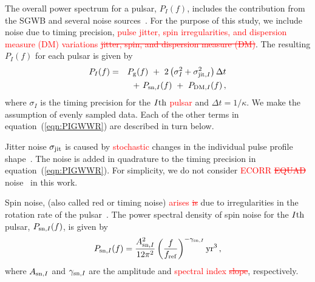 \documentclass[fleqn,usenatbib]{mnras}
\newcommand{\fref}{f_{\rm ref}}
\newcommand{\ARedI}{A_{{\rm sn},I}}
\newcommand{\gammaRedI}{\gamma_{{\rm sn},I}}
\newcommand{\ADMI}{A_{{\rm DM},I}}
\newcommand{\gammaDMI}{\gamma_{{\rm DM},I}}
\newcommand{\Pg}{P_{\rm g}}
\newcommand{\PI}{P_I}
\newcommand{\PsnI}{P_{{\rm sn},I}}
\newcommand{\PdmI}{P_{{\rm DM},I}}
\newcommand{\change}{\textcolor{red}}
\begin{document}
The overall power spectrum for a pulsar, $\PI (f)$, includes the contribution from the SGWB and several noise sources~\cite[see][for a review of pulsar noise]{WangNoiseReview:2015}.
For the purpose of this study, we include noise due to timing precision, \change{pulse jitter, spin irregularities, and dispersion measure (DM) variations \st{jitter, spin, and dispersion measure (DM)}}. 
The resulting $\PI (f)$ for each pulsar is given by
\begin{eqnarray}
\PI (f) &=& \Pg (f) ~+~ 2 \left( \sigma_I^2 + \sigma_{{\rm jit}, I}^2 \right) \Delta t \nonumber\\
        & &~+~\PsnI (f) ~+~ \PdmI (f) \,,
\label{eqn:PIGWWR}
\end{eqnarray}
where $\sigma_I$ is the timing precision for the $I{\rm th}$ \change{pulsar} and $\Delta t=1/\kappa$. 
We make the assumption of evenly sampled data. 
Each of the other terms in equation~(\ref{eqn:PIGWWR}) are described in turn below. 


Jitter noise $\sigma_{\rm jit}$ is caused by \change{stochastic} changes in the individual pulse profile shape~\citep[e.g][]{CordesDowns:1985, ParthasarathyEtAl:2021}.
The noise is added in quadrature to the timing precision in equation~(\ref{eqn:PIGWWR}).
For simplicity, we do not consider \change{ECORR \st{EQUAD}} noise~\cite[see, e.g.,][]{GoncharovEtAl:2021} in this work. 


Spin noise, (also called red or timing noise) \change{arises \st{is}} due to irregularities in the rotation rate of the pulsar~\cite[e.g.][]{ShannonCordes:2010}. 
The power spectral density of spin noise for the $I{\rm th}$ pulsar, $\PsnI (f)$, is given by~\cite[see, e.g.,][]{PPTAGWReardonEtAl:2023, GoncharovEtAl:2021}
\begin{equation}
\PsnI (f) = \frac{\ARedI^2}{12 \pi^2} 
            \left( \frac{f}{\fref} \right)^{-\gammaRedI} 
            {\rm yr}^3\,,
\end{equation}
where $\ARedI$ and $\gammaRedI$ are the amplitude and \change{spectral index \st{slope}}, respectively.
\end{document}

